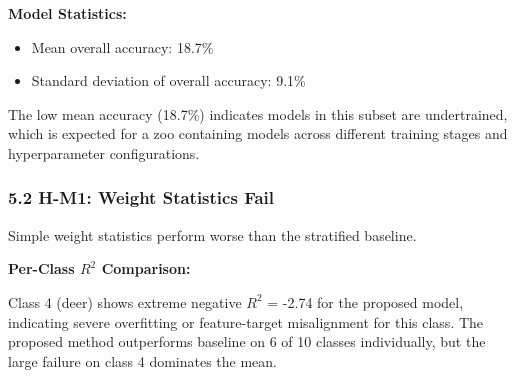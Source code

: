 \textbf{Model Statistics:}
\begin{itemize}
\item Mean overall accuracy: 18.7\%
\item Standard deviation of overall accuracy: 9.1\%
\end{itemize}

The low mean accuracy (18.7\%) indicates models in this subset are undertrained, which is expected for a zoo containing models across different training stages and hyperparameter configurations.

\subsubsection{5.2 H-M1: Weight Statistics Fail}

\begin{table}[htbp]
\centering
{}
\end{table}

Simple weight statistics perform worse than the stratified baseline.

\textbf{Per-Class $R^2$ Comparison:}

\begin{table}[htbp]
\centering
{}
\end{table}

Class 4 (deer) shows extreme negative $R^2$ = -2.74 for the proposed model, indicating severe overfitting or feature-target misalignment for this class. The proposed method outperforms baseline on 6 of 10 classes individually, but the large failure on class 4 dominates the mean.
